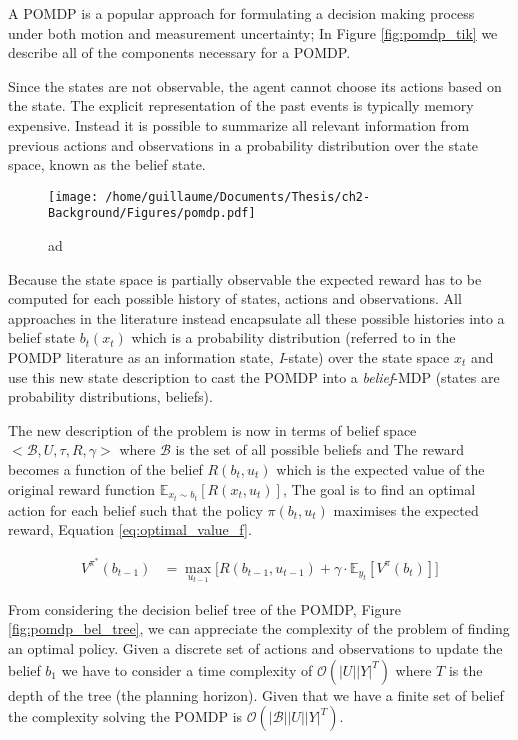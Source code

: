 A POMDP is a popular approach for formulating a decision making process under both motion and measurement uncertainty;
In Figure \ref{fig:pomdp_tik} we describe all of the components necessary for a POMDP.

Since the states are not observable, the agent cannot choose its actions based on the state. The explicit 
representation of the past events is typically memory expensive. Instead it is possible to summarize all relevant 
information from previous actions and observations in a probability distribution over the state space, known as the
belief state. 

\begin{figure}[h]
 \centering
 \texttt{[image: /home/guillaume/Documents/Thesis/ch2-Background/Figures/pomdp.pdf]}
  \caption{ad}
\end{figure}


Because the state space is partially observable the expected reward has to be computed for each possible history of states, actions and observations.
All approaches in the literature instead encapsulate all these possible histories into a belief state $b_t(x_t)$ which is a 
probability distribution (referred to in the POMDP literature as an information state, \textit{I}-state) over the state space $x_t$ and use this 
new state description to cast the POMDP into a \textit{belief}-MDP (states are probability distributions, beliefs). 

The new description of the problem is now in terms of belief space $<\mathcal{B},U,\tau,R,\gamma>$ where $\mathcal{B}$ is the set of 
all possible beliefs and 
The reward becomes a function of the belief $R(b_t,u_t)$ which is the expected value of the original reward 
function $\mathbb{E}_{x_t \sim b_t}[R(x_t,u_t)]$, The goal is to find an optimal action for each belief such that 
the policy $\pi(b_t,u_t)$ maximises the expected reward, Equation \ref{eq:optimal_value_f}.

\begin{align}\label{eq:optimal_value_f}
 V^{\pi^*}(b_{t-1}) &= \max_{u_{t-1}} \bigg[ R(b_{t-1},u_{t-1}) + \gamma \cdot \mathbb{E}_{y_t}\left[ V^{\pi}(b_t)  \right] \bigg]
\end{align}

From considering the decision belief tree of the POMDP, Figure \ref{fig:pomdp_bel_tree}, we can appreciate the complexity of the problem
of finding an optimal policy. Given a discrete set of actions and observations to update the belief $b_1$ we have to consider a time 
complexity of $\mathcal{O}(|U||Y|^T)$ where $T$ is the depth of the tree (the planning horizon). Given that we have a finite set of 
belief the complexity solving the POMDP is $\mathcal{O}(|\mathcal{B}||U||Y|^T)$. 



